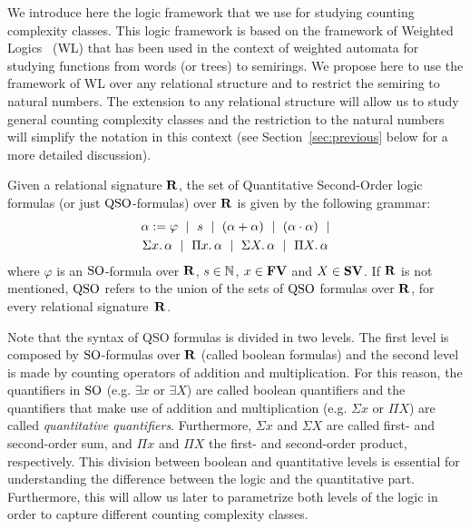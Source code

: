 
We introduce here the logic framework that we use for studying counting complexity classes. 
This logic framework is based on the framework of Weighted Logics~\cite{DrosteG07} (WL) that has been used in the context of weighted automata for studying functions from words (or trees) to semirings. 
We propose here to use the framework of WL over any relational structure and to restrict the semiring to natural numbers. 
The extension to any relational structure will allow us to study general counting complexity classes and the restriction to the natural numbers will simplify the notation in this context (see Section~\ref{sec:previous} below for a more detailed discussion).

Given a relational signature $\mathbf{R}$, the set of Quantitative Second-Order logic formulas (or just ${\rm QSO}$-formulas) over $\mathbf{R}$ is given by the following grammar:
\begin{multline*}
\alpha := \varphi \ \mid \ s \ \mid \ (\alpha \add \alpha) \ \mid\ (\alpha \mult \alpha) \ \mid \\ \sa{x} \alpha \ \mid \ \pa{x} \alpha \ \mid \ \sa{X} \alpha \ \mid \ \pa{X} \alpha 
\end{multline*}
where $\varphi$ is an ${\rm SO}$-formula over $\mathbf{R}$, $s \in \mathbb{N}$, $x \in \mathbf{FV}$ and $X \in \mathbf{SV}$. If $\mathbf{R}$ is not mentioned, ${\rm QSO}$ refers to the union of the sets of ${\rm QSO}$ formulas over $\mathbf{R}$, for every relational signature~$\mathbf{R}$.
 
Note that the syntax of QSO formulas is divided in two levels. 
The first level is composed by ${\rm SO}$-formulas over $\mathbf{R}$ (called boolean formulas) and the second level is made by counting operators of addition and multiplication. 
For this reason, the quantifiers in ${\rm SO}$ (e.g. $\exists x$ or $\exists X$) are called boolean quantifiers and the quantifiers that make use of addition and multiplication (e.g. $\Sigma x$ or $\Pi X$) are called {\em quantitative quantifiers}.
Furthermore, $\Sigma x$ and $\Sigma X$ are called first- and second-order sum, and $\Pi x$ and $\Pi X$ the first- and second-order product, respectively.
This division between boolean and quantitative levels is essential for understanding the difference between the logic and the quantitative part. 
Furthermore, this will allow us later to parametrize both levels of the logic in order to capture different counting complexity classes.

